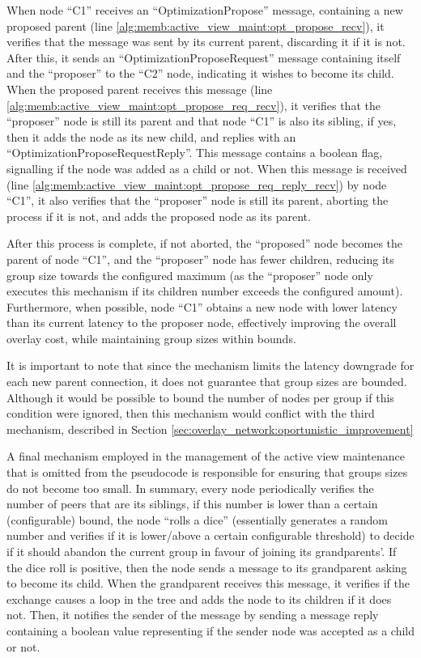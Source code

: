 When node ``C1'' receives an ``OptimizationPropose'' message, containing a new proposed parent (line \ref{alg:memb:active_view_maint:opt_propose_recv}), it verifies that the message was sent by its current parent, discarding it if it is not. After this, it sends an ``OptimizationProposeRequest'' message containing itself and the ``proposer'' to the ``C2'' node, indicating it wishes to become its child. When the proposed parent receives this message (line \ref{alg:memb:active_view_maint:opt_propose_req_recv}), it verifies that the ``proposer'' node is still its parent and that node ``C1'' is also its sibling, if yes, then it adds the node as its new child, and replies with an ``OptimizationProposeRequestReply''. This message contains a boolean flag, signalling if the node was added as a child or not. When this message is received (line \ref{alg:memb:active_view_maint:opt_propose_req_reply_recv}) by node ``C1'', it also verifies that the ``proposer'' node is still its parent, aborting the process if it is not, and adds the proposed node as its parent.

After this process is complete, if not aborted, the ``proposed'' node becomes the parent of node ``C1'', and the ``proposer'' node has fewer children, reducing its group size towards the configured maximum (as the ``proposer'' node only executes this mechanism if its children number exceeds the configured amount). Furthermore, when possible, node ``C1'' obtains a new node with lower latency than its current latency to the proposer node, effectively improving the overall overlay cost, while maintaining group sizes within bounds.

It is important to note that since the mechanism limits the latency downgrade for each new parent connection, it does not guarantee that group sizes are bounded. Although it would be possible to bound the number of nodes per group if this condition were ignored, then this mechanism would conflict with the third mechanism, described in Section \ref{sec:overlay_network:oportunistic_improvement}

A final mechanism employed in the management of the active view maintenance that is omitted from the pseudocode is responsible for ensuring that groups sizes do not become too small. In summary, every node periodically verifies the number of peers that are its siblings, if this number is lower than a certain (configurable) bound, the node ``rolls a dice'' (essentially generates a random number and verifies if it is lower/above a certain configurable threshold) to decide if it should abandon the current group in favour of joining its grandparents'. If the dice roll is positive, then the node sends a message to its grandparent asking to become its child. When the grandparent receives this message, it verifies if the exchange causes a loop in the tree and adds the node to its children if it does not. Then, it notifies the sender of the message by sending a message reply containing a boolean value representing if the sender node was accepted as a child or not. 

